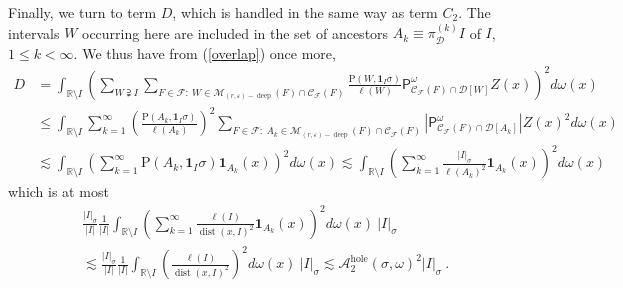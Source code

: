 \documentclass{amsart}%
\theoremstyle{plain}
\numberwithin{equation}{section}
\begin{document}
Finally, we turn to term $D$, which is handled in the same way as term $C_{2}%
$. The intervals $W$ occurring here are included in the set of ancestors
$A_{k}\equiv\pi_{\mathcal{D}}^{\left(  k\right)  }I$ of $I$, $1\leq k<\infty$.
We thus have from (\ref{overlap}) once more,%
\begin{align*}
D  & =\int_{\mathbb{R}\setminus I}\left(  \sum_{W\supsetneqq I}\sum
_{F\in\mathcal{F}:\ W\in\mathcal{M}_{\left(  r,\varepsilon\right)
-\operatorname*{deep}}\left(  F\right)  \cap\mathcal{C}_{\mathcal{F}}\left(
F\right)  }\frac{\mathrm{P}\left(  W,\mathbf{1}_{I}\sigma\right)  }%
{\ell\left(  W\right)  }\mathsf{P}_{\mathcal{C}_{\mathcal{F}}\left(  F\right)
\cap\mathcal{D}\left[  W\right]  }^{\omega}Z\left(  x\right)  \right)
^{2}d\omega\left(  x\right)  \\
& \leq\int_{\mathbb{R}\setminus I}\sum_{k=1}^{\infty}\left(  \frac
{\mathrm{P}\left(  A_{k},\mathbf{1}_{I}\sigma\right)  }{\ell\left(
A_{k}\right)  }\right)  ^{2}\sum_{F\in\mathcal{F}:\ A_{k}\in\mathcal{M}%
_{\left(  r,\varepsilon\right)  -\operatorname*{deep}}\left(  F\right)
\cap\mathcal{C}_{\mathcal{F}}\left(  F\right)  }\left\vert \mathsf{P}%
_{\mathcal{C}_{\mathcal{F}}\left(  F\right)  \cap\mathcal{D}\left[
A_{k}\right]  }^{\omega}\right\vert Z\left(  x\right)  ^{2}d\omega\left(
x\right)  \\
& \lesssim\int_{\mathbb{R}\setminus I}\left(  \sum_{k=1}^{\infty}%
\mathrm{P}\left(  A_{k},\mathbf{1}_{I}\sigma\right)  \mathbf{1}_{A_{k}}\left(
x\right)  \right)  ^{2}d\omega\left(  x\right)  \lesssim\int_{\mathbb{R}%
\setminus I}\left(  \sum_{k=1}^{\infty}\frac{\left\vert I\right\vert _{\sigma
}}{\ell\left(  A_{k}\right)  ^{2}}\mathbf{1}_{A_{k}}\left(  x\right)  \right)
^{2}d\omega\left(  x\right)
\end{align*}
which is at most%
\begin{align*}
& \frac{\left\vert I\right\vert _{\sigma}}{\left\vert I\right\vert }\frac
{1}{\left\vert I\right\vert }\int_{\mathbb{R}\setminus I}\left(  \sum
_{k=1}^{\infty}\frac{\ell\left(  I\right)  }{\operatorname*{dist}\left(
x,I\right)  ^{2}}\mathbf{1}_{A_{k}}\left(  x\right)  \right)  ^{2}%
d\omega\left(  x\right)  \ \left\vert I\right\vert _{\sigma}\\
& \lesssim\frac{\left\vert I\right\vert _{\sigma}}{\left\vert I\right\vert
}\frac{1}{\left\vert I\right\vert }\int_{\mathbb{R}\setminus I}\left(
\frac{\ell\left(  I\right)  }{\operatorname*{dist}\left(  x,I\right)  ^{2}%
}\right)  ^{2}d\omega\left(  x\right)  \ \left\vert I\right\vert _{\sigma
}\lesssim\mathcal{A}_{2}^{\operatorname*{hole}}\left(  \sigma,\omega\right)
^{2}\left\vert I\right\vert _{\sigma}\ .
\end{align*}
\end{document}
